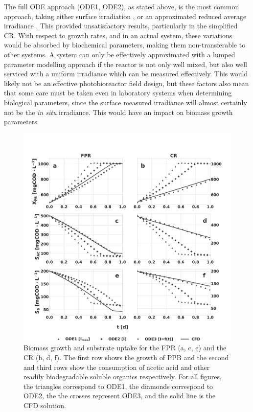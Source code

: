 The full ODE approach (ODE1, ODE2), as stated above, is the most common approach, taking either surface irradiation \cite{uyar2007, zhou2014}, or an approximated reduced average irradiance \cite{lee1987, molinagrima1996, bordel2009}. This provided unsatisfactory results, particularly in the simplified CR. With respect to growth rates, and in an actual system, these variations would be absorbed by biochemical parameters, making them non-transferable to other systems. A system can only be effectively approximated with a lumped parameter modelling approach if the reactor is not only well mixed, but also well serviced with a uniform irradiance which can be measured effectively. This would likely not be an effective photobioreactor field design, but these factors also mean that some care must be taken even in laboratory systems when determining biological parameters, since the surface measured irradiance will almost certainly not be the \textit{in situ} irradiance. This would have an impact on biomass growth parameters. 

\begin{figure}[tp]
\centering
\includegraphics[scale=0.38]{Images/Chap3/growth_kinetics.pdf}
\caption{Biomass growth and substrate uptake for the FPR (a, c, e) and the CR (b, d, f). The first row shows the growth of PPB and the second and third rows show the consumption of acetic acid and other readily biodegradable soluble organics respectively. For all figures, the triangles correspond to ODE1, the diamonds correspond to ODE2, the the crosses represent ODE3, and the solid line is the CFD solution.}
\label{fig:growth_evol}
\end{figure}

